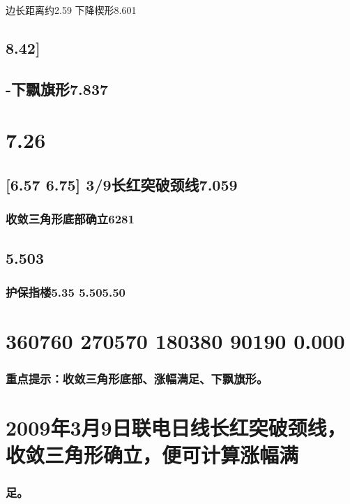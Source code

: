 \documentclass{article}
\begin{document}
边长距离约2.59 下降楔形8.601

\subsection{8.42]}

\subsection{-下飘旗形7.837}

\section{7.26}

\subsection{[6.57 6.75] 3/9长红突破颈线7.059}

\subsubsection{收敛三角形底部确立6281}

\subsection{5.503}

\subsubsection{护保指楼5.35 5.505.50}

\section{360760 270570 180380 90190 0.000}

\subsubsection{重点提示：收敛三角形底部、涨幅满足、下飘旗形。}

\section{2009年3月9日联电日线长红突破颈线，收敛三角形确立，便可计算涨幅满}

\subsubsection{足。}
\end{document}
